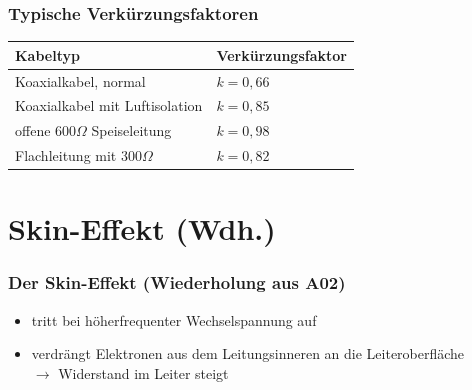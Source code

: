\begin{frame}
  \frametitle{Typische Verkürzungsfaktoren}
  \begin{center}
    \begin{tabular}{l|l}
      \textbf{Kabeltyp} & \textbf{Verkürzungsfaktor} \\ \hline
      Koaxialkabel, normal & $k = 0,66$ \\
      Koaxialkabel mit Luftisolation & $k = 0,85$ \\
      offene $600 \Omega$ Speiseleitung & $k = 0,98$ \\
      Flachleitung mit $300 \Omega$ & $k = 0,82$ \\
    \end{tabular}
  \end{center}
\end{frame}

\section*{Skin-Effekt (Wdh.)}
\begin{frame}
  \frametitle{Der Skin-Effekt (Wiederholung aus A02)}
  \begin{itemize}
    \item tritt bei höherfrequenter Wechselspannung auf
    \item verdrängt Elektronen aus dem Leitungsinneren an die Leiteroberfläche \\
      $\rightarrow$ Widerstand im Leiter steigt
  \end{itemize}
\end{frame}

